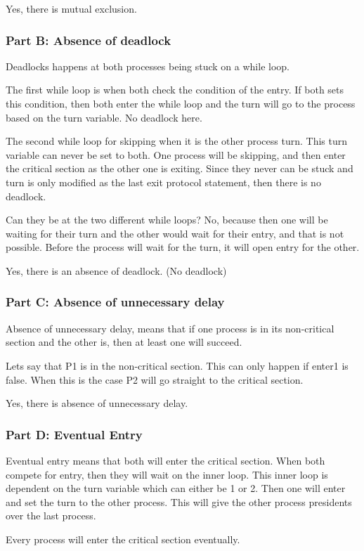 Yes, there is mutual exclusion.



\subsubsection{Part B: Absence of deadlock}

Deadlocks happens at both processes being stuck on a while loop. 

The first while loop is when both check the condition of the entry. If both sets this condition, then both enter the while loop and the turn will go to the process based on the turn variable. No deadlock here.

The second while loop for skipping when it is the other process turn. 
This turn variable can never be set to both. One process will be skipping, and then enter the critical section as the other one is exiting. Since they never can be stuck and turn is only modified as the last exit protocol statement, then there is no deadlock. 

Can they be at the two different while loops? No, because then one will be waiting for their turn and the other would wait for their entry, and that is not possible. Before the process will wait for the turn, it will open entry for the other. 

Yes, there is an absence of deadlock. (No deadlock)

\subsubsection{Part C: Absence of unnecessary delay}

Absence of unnecessary delay, means that if one process is in its non-critical section and the other is, then at least one will succeed. 

Lets say that P1 is in the non-critical section. This can only happen if enter1 is false. When this is the case P2 will go straight to the critical section.  

Yes, there is absence of unnecessary delay.

\subsubsection{Part D: Eventual Entry}

Eventual entry means that both will enter the critical section. When both compete for entry, then they will wait on the inner loop. This inner loop is dependent on the turn variable which can either be 1 or 2. Then one will enter and set the turn to the other process. This will give the other process presidents over the last process. 

Every process will enter the critical section eventually.